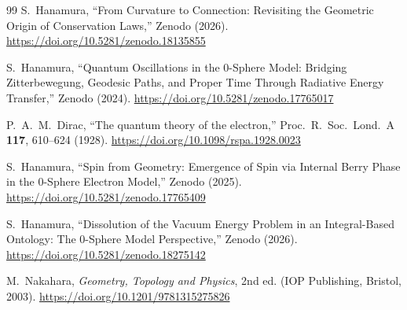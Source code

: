 \documentclass[12pt,letterpaper]{article}
\begin{document}
\begin{thebibliography}{99}
S.~Hanamura,
``From Curvature to Connection: Revisiting the Geometric Origin of Conservation Laws,''
Zenodo (2026).
\href{https://doi.org/10.5281/zenodo.18135855}{https://doi.org/10.5281/zenodo.18135855}

S.~Hanamura,
``Quantum Oscillations in the 0-Sphere Model: Bridging Zitterbewegung, Geodesic Paths, and Proper Time Through Radiative Energy Transfer,''
Zenodo (2024).
\href{https://doi.org/10.5281/zenodo.17765017}{https://doi.org/10.5281/zenodo.17765017}

P.~A.~M.~Dirac,
``The quantum theory of the electron,''
Proc.\ R.\ Soc.\ Lond.\ A \textbf{117}, 610--624 (1928).
\href{https://doi.org/10.1098/rspa.1928.0023}{https://doi.org/10.1098/rspa.1928.0023}

S.~Hanamura,
``Spin from Geometry: Emergence of Spin via Internal Berry Phase in the 0-Sphere Electron Model,''
Zenodo (2025).
\href{https://doi.org/10.5281/zenodo.17765409}{https://doi.org/10.5281/zenodo.17765409}

S.~Hanamura,
``Dissolution of the Vacuum Energy Problem in an Integral-Based Ontology: The 0-Sphere Model Perspective,''
Zenodo (2026).
\href{https://doi.org/10.5281/zenodo.18275142}{https://doi.org/10.5281/zenodo.18275142}

M.~Nakahara,
\textit{Geometry, Topology and Physics}, 2nd ed.
(IOP Publishing, Bristol, 2003).
\href{https://doi.org/10.1201/9781315275826}{https://doi.org/10.1201/9781315275826}

\end{thebibliography}
\end{document}
